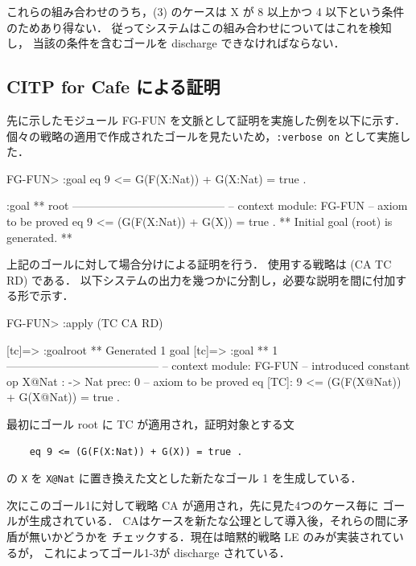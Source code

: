 \documentclass[a4paper,oneside,10pt,here]{memoir}
\newenvironment{vvtm}%
{\parskip=0pt\lineskip=0pt\begin{center}\begin{minipage}{0.8\textwidth}\begin{snugshade}}%
  {\end{snugshade}\end{minipage}\end{center}}
\begin{document}
これらの組み合わせのうち，(3) のケースは
X が 8 以上かつ 4 以下という条件のためあり得ない．
従ってシステムはこの組み合わせについてはこれを検知し，
当該の条件を含むゴールを discharge できなければならない．

\subsection{CITP for Cafe による証明}

先に示したモジュール FG-FUN を文脈として証明を実施した例を以下に示す．
個々の戦略の適用で作成されたゴールを見たいため，\verb|:verbose on| として実施した．

\begin{vvtm}
  \begin{simplev}
FG-FUN> :goal { eq 9 <= G(F(X:Nat)) + G(X:Nat) = true . }

:goal { ** root -----------------------------------------
  -- context module: FG-FUN
  -- axiom to be proved
    eq 9 <= (G(F(X:Nat)) + G(X)) = true .
}
** Initial goal (root) is generated. **
  \end{simplev}
\end{vvtm}

上記のゴールに対して場合分けによる証明を行う．
使用する戦略は (CA TC RD) である．
以下システムの出力を幾つかに分割し，必要な説明を間に付加する形で示す．

\begin{vvtm}
  \begin{simplev}
FG-FUN> :apply (TC CA RD)

[tc]=> :goal{root}
** Generated 1 goal
[tc]=>
:goal { ** 1 -----------------------------------------
  -- context module: FG-FUN
  -- introduced constant
    op X@Nat : -> Nat { prec: 0 }
  -- axiom to be proved
    eq [TC]: 9 <= (G(F(X@Nat)) + G(X@Nat))
        = true .
}
\end{simplev}
\end{vvtm}
最初にゴール root に TC が適用され，証明対象とする文
\begin{verbatim}
    eq 9 <= (G(F(X:Nat)) + G(X)) = true .
\end{verbatim}
の \texttt{X} を \verb|X@Nat| に置き換えた文とした新たなゴール 1 を生成している．

次にこのゴール1に対して戦略 CA が適用され，先に見た4つのケース毎に
ゴールが生成されている．
CAはケースを新たな公理として導入後，それらの間に矛盾が無いかどうかを
チェックする．現在は暗黙的戦略 LE のみが実装されているが，
これによってゴール1-3が discharge されている．
\end{document}
